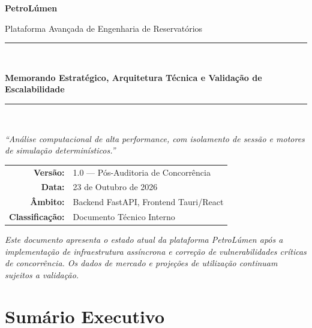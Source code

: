 \documentclass[12pt,a4paper]{article}
\begin{document}
\begin{titlepage}
  \thispagestyle{empty}
  \centering
  \vspace*{1.8cm}
  {\Huge\bfseries\color{primary} PetroLúmen\par}
  \vspace{0.6cm}
  {\Large\color{secondary} Plataforma Avançada de Engenharia de Reservatórios\par}
  \vspace{1.4cm}
  \rule{\textwidth}{1.4pt}\\[0.45cm]
  {\large\bfseries Memorando Estratégico, Arquitetura Técnica e Validação de Escalabilidade\par}
  \rule{\textwidth}{1.4pt}\\[1.5cm]
  \begin{minipage}{0.86\textwidth}
    \centering\large
    \textit{``Análise computacional de alta performance, com isolamento de sessão e motores de simulação determinísticos.''}
  \end{minipage}
  \vfill
  \begin{tabular}{rl}
    \textbf{Versão:} & 1.0 --- Pós-Auditoria de Concorrência \\[0.35em]
    \textbf{Data:} & 23 de Outubro de 2026 \\[0.35em]
    \textbf{Âmbito:} & Backend FastAPI, Frontend Tauri/React \\[0.35em]
    \textbf{Classificação:} & Documento Técnico Interno
  \end{tabular}
  \vspace{1.1cm}
  \begin{minipage}{0.9\textwidth}
    \small\textit{Este documento apresenta o estado atual da plataforma PetroLúmen após a implementação de infraestrutura assíncrona e correção de vulnerabilidades críticas de concorrência. Os dados de mercado e projeções de utilização continuam sujeitos a validação.}
  \end{minipage}
\end{titlepage}

\tableofcontents
\clearpage

\section*{Sumário Executivo}
\end{document}
